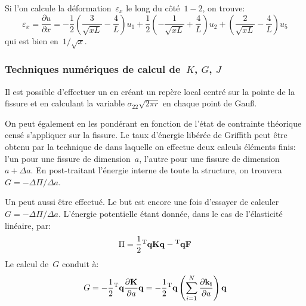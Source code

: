 Si l'on calcule la déformation~$\varepsilon_x$ le long du côté~$1-2$, on trouve:
\begin{equation} \varepsilon_x = \dfrac{\partial u}{\partial x} =
-\frac12\left( \frac3{\sqrt{xL}}-\frac4L\right)u_1 + \frac12\left(-\frac1{\sqrt{xL}}+\frac4L\right)u_2
+\left(\frac2{\sqrt{xL}}-\frac4L\right)u_5 \end{equation}
qui est bien en~$1/\sqrt{x}$.

\medskip
\subsubsection{Techniques numériques de calcul de~$K$, $G$, $J$}

Il est possible d'effectuer un  en créant un repère local centré sur la pointe de la fissure et en calculant la variable $\sigma_{22}\sqrt{2\pi r}$ en chaque point de Gauß.

\medskip
On peut également  en les pondérant en fonction de l'état de contrainte théorique censé s'appliquer sur la fissure.
\medskipvm
Le taux d'énergie libérée de Griffith peut être obtenu par la technique de  dans laquelle on effectue deux calculs éléments finis: l'un pour une fissure de dimension~$a$, l'autre pour une fissure de dimension~$a+\Delta a$. En post-traitant l'énergie interne de toute la structure, on trouvera~$G=-\Delta\Pi/\Delta a$. 

\medskip
Un  peut aussi être effectué. Le but est encore une fois d'essayer de calculer~$G=-\Delta\Pi/\Delta a$. L'énergie potentielle étant donnée, dans le cas de l'élasticité linéaire, par:
\begin{equation}\Pi = \frac12\LL{q}\MM{K}\VV{q}-\LL{q}\VV{F}\end{equation}
Le calcul de~$G$ conduit à:
\begin{equation}G = -\frac12\LL{q}\dfrac{\partial\MM{K}}{\partial a}\VV{q} =
-\frac12\LL{q}\left(\dsum_{i=1}^N \dfrac{\partial\MM{k_i}}{\partial a}\right)\VV{q}\end{equation}


